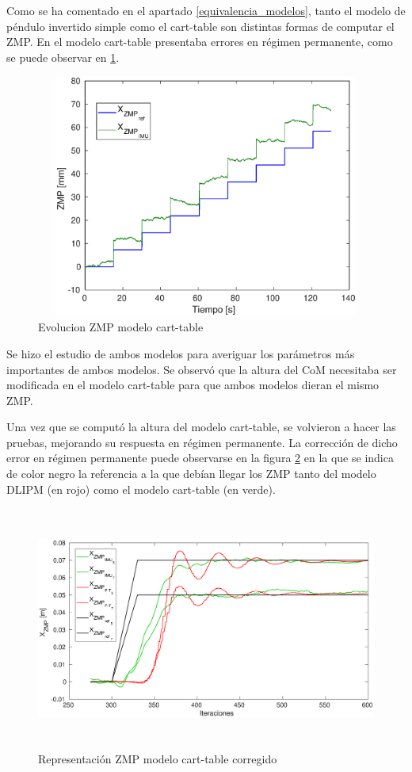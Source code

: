 Como se ha comentado en el apartado \ref{equivalencia_modelos}, tanto el modelo de péndulo invertido simple como el cart-table son distintas formas de computar el ZMP. En \cite{ref22} el modelo cart-table presentaba errores en régimen permanente, como se puede observar en \ref{figura514}.


\begin{figure}[H]
\centering
\includegraphics[width=13cm, height=8cm]{imagenes/apartado_5/test6_imu2}
\caption{Evolucion ZMP modelo cart-table}
\label{figura514}
\end{figure}

Se hizo el estudio de ambos modelos para averiguar los parámetros más importantes de ambos modelos. Se observó que la altura del CoM necesitaba ser modificada en el modelo cart-table para que ambos modelos dieran el mismo ZMP.

Una vez que se computó la altura del modelo cart-table, se volvieron a hacer las pruebas, mejorando su respuesta en régimen permanente. La corrección de dicho error en régimen permanente puede observarse en la figura \ref{figura515} en la que se indica de color negro la referencia a la que debían llegar los ZMP tanto del modelo DLIPM (en rojo) como el modelo cart-table (en verde).

\begin{figure}[H]
\centering
\includegraphics[width=13cm, height=8cm]{imagenes/apartado_5/test2_imu}
\caption{Representación ZMP modelo cart-table corregido}
\label{figura515}
\end{figure}


\afterpage{\null\newpage}
\newpage
